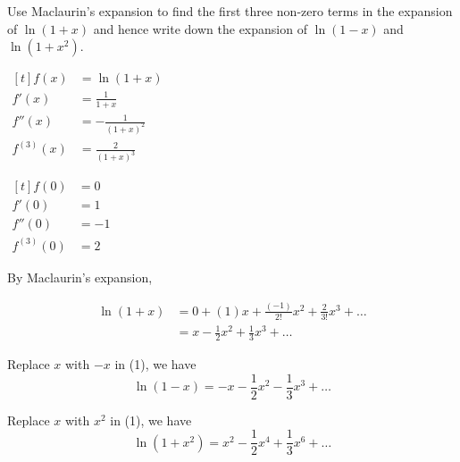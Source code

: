\documentclass[11pt,a4paper]{book}
\begin{document}
\begin{example}

Use Maclaurin's expansion to find the first three non-zero
terms in the expansion of $\ln\left(1+x\right)$ and hence write down
the expansion of $\ln\left(1-x\right)$ and $\ln\left(1+x^{2}\right)$.

\Solution

\begin{minipage}[t]{0.4\textwidth}

$
\begin{aligned}[t]
f\left(x\right) & =\ln\left(1+x\right)\\
f'\left(x\right) & =\frac{1}{1+x}\\
f''\left(x\right) & =-\frac{1}{\left(1+x\right)^{2}}\\
f^{\left(3\right)}\left(x\right) & =\frac{2}{\left(1+x\right)^{3}}
\end{aligned}
$

\end{minipage}
\vline\hfill
\begin{minipage}[t]{0.5\textwidth}

$
\begin{aligned}[t]
f\left(0\right) & =0\\
f'\left(0\right) & =1\\
f''\left(0\right) & =-1\\
f^{\left(3\right)}\left(0\right) & =2
\end{aligned}
$

\end{minipage}

\medskip

By Maclaurin's expansion,

\begin{align*}
\ln\left(1+x\right) & =0+\left(1\right)x+\frac{\left(-1\right)}{2!}x^{2}+\frac{2}{3!}x^{3}+\ldots\\
 & =x-\frac{1}{2}x^{2}+\frac{1}{3}x^{3}+\ldots\tag{1}
\end{align*}

Replace $x$ with $-x$ in (1), we have
\[
\ln\left(1-x\right)=-x-\frac{1}{2}x^{2}-\frac{1}{3}x^{3}+\ldots
\]

Replace $x$ with $x^{2}$ in (1), we have
\[
\ln\left(1+x^{2}\right)=x^{2}-\frac{1}{2}x^{4}+\frac{1}{3}x^{6}+\ldots
\]

\end{example}
\end{document}
